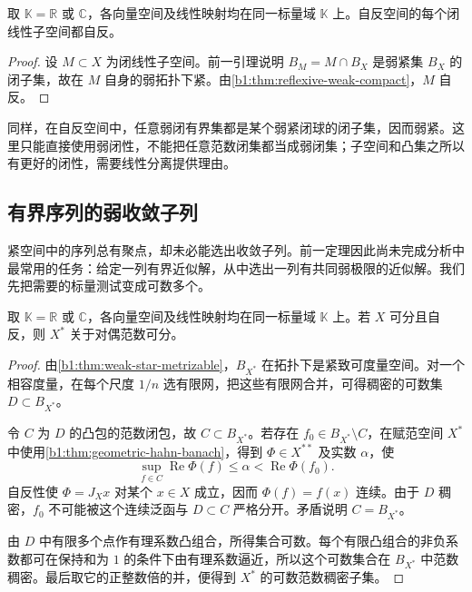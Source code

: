 \begin{corollary}\label{b1:cor:closed-subspace-reflexive}
取 \(\mathbb K=\mathbb R\) 或 \(\mathbb C\)，各向量空间及线性映射均在同一标量域 \(\mathbb K\) 上。自反空间的每个闭线性子空间都自反。
\end{corollary}
\begin{proof}
设 \(M\subset X\) 为闭线性子空间。前一引理说明 \(B_M=M\cap B_X\) 是弱紧集 \(B_X\) 的闭子集，故在 \(M\) 自身的弱拓扑下紧。由\cref{b1:thm:reflexive-weak-compact}，\(M\) 自反。
\end{proof}

同样，在自反空间中，任意弱闭有界集都是某个弱紧闭球的闭子集，因而弱紧。这里只能直接使用弱闭性，不能把任意范数闭集都当成弱闭集；子空间和凸集之所以有更好的闭性，需要线性分离提供理由。

\subsection{有界序列的弱收敛子列}
\label{b1:subsec:090402}

紧空间中的序列总有聚点，却未必能选出收敛子列。前一定理因此尚未完成分析中最常用的任务：给定一列有界近似解，从中选出一列有共同弱极限的近似解。我们先把需要的标量测试变成可数多个。

\begin{lemma}\label{b1:lem:separable-reflexive-dual}
取 \(\mathbb K=\mathbb R\) 或 \(\mathbb C\)，各向量空间及线性映射均在同一标量域 \(\mathbb K\) 上。若 \(X\) 可分且自反，则 \(X^*\) 关于对偶范数可分。
\end{lemma}
\begin{proof}
由\cref{b1:thm:weak-star-metrizable}，\(B_{X^*}\) 在\WeakStar{}拓扑下是紧致可度量空间。对一个相容度量，在每个尺度 \(1/n\) 选有限网，把这些有限网合并，可得\WeakStar{}稠密的可数集 \(D\subset B_{X^*}\)。

令 \(C\) 为 \(D\) 的凸包的范数闭包，故 \(C\subset B_{X^*}\)。若存在 \(f_0\in B_{X^*}\setminus C\)，在赋范空间 \(X^*\) 中使用\cref{b1:thm:geometric-hahn-banach}，得到 \(\Phi\in X^{**}\) 及实数 \(\alpha\)，使
\[
 \sup_{f\in C}\operatorname{Re}\Phi(f)\le\alpha
 <\operatorname{Re}\Phi(f_0).
\]
自反性使 \(\Phi=J_Xx\) 对某个 \(x\in X\) 成立，因而 \(\Phi(f)=f(x)\) \WeakStar{}连续。由于 \(D\) \WeakStar{}稠密，\(f_0\) 不可能被这个连续泛函与 \(D\subset C\) 严格分开。矛盾说明 \(C=B_{X^*}\)。

由 \(D\) 中有限多个点作有理系数凸组合，所得集合可数。每个有限凸组合的非负系数都可在保持和为 \(1\) 的条件下由有理系数逼近，所以这个可数集合在 \(B_{X^*}\) 中范数稠密。最后取它的正整数倍的并，便得到 \(X^*\) 的可数范数稠密子集。
\end{proof}


